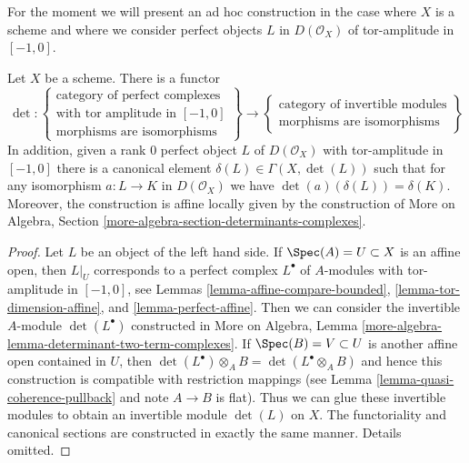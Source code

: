 \medskip\noindent
For the moment we will present an ad hoc construction in the case
where $X$ is a scheme and where we consider perfect objects $L$ in
$D(\mathcal{O}_X)$ of tor-amplitude in $[-1, 0]$.

\begin{lemma}
\label{lemma-determinant-two-term-complexes}
Let $X$ be a scheme. There is a functor
$$
\det :
\left\{
\begin{matrix}
\text{category of perfect complexes} \\
\text{with tor amplitude in }[-1, 0] \\
\text{morphisms are isomorphisms}
\end{matrix}
\right\}
\longrightarrow
\left\{
\begin{matrix}
\text{category of invertible modules} \\
\text{morphisms are isomorphisms}
\end{matrix}
\right\}
$$
In addition, given a rank $0$ perfect object $L$ of $D(\mathcal{O}_X)$ with
tor-amplitude in $[-1, 0]$ there is a canonical element
$\delta(L) \in \Gamma(X, \det(L))$ such that for any isomorphism
$a : L \to K$ in $D(\mathcal{O}_X)$ we have $\det(a)(\delta(L)) = \delta(K)$.
Moreover, the construction is affine locally given by the construction
of More on Algebra, Section \ref{more-algebra-section-determinants-complexes}.
\end{lemma}

\begin{proof}
Let $L$ be an object of the left hand side. If $\Spec(A) = U \subset X$
is an affine open, then $L|_U$ corresponds to a perfect complex $L^\bullet$
of $A$-modules with tor-amplitude in $[-1, 0]$, see
Lemmas \ref{lemma-affine-compare-bounded},
\ref{lemma-tor-dimension-affine}, and
\ref{lemma-perfect-affine}.
Then we can consider the invertible $A$-module $\det(L^\bullet)$ constructed in
More on Algebra, Lemma \ref{more-algebra-lemma-determinant-two-term-complexes}.
If $\Spec(B) = V \subset U$ is another affine open contained in $U$,
then $\det(L^\bullet) \otimes_A B = \det(L^\bullet \otimes_A B)$
and hence this construction is compatible with restriction mappings
(see Lemma \ref{lemma-quasi-coherence-pullback} and note $A \to B$ is flat).
Thus we can glue these invertible modules to obtain an invertible module
$\det(L)$ on $X$. The functoriality and canonical sections
are constructed in exactly the same manner. Details omitted.
\end{proof}

